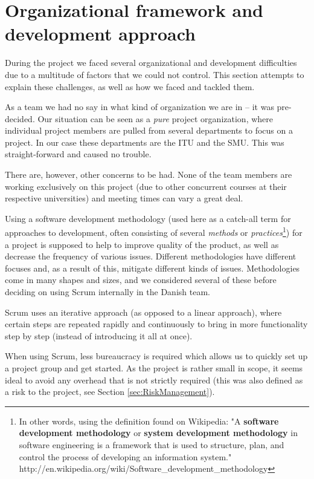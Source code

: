 \section{Organizational framework and development approach}
During the project we faced several organizational and development difficulties due to a multitude of factors that we could not control. This section attempts to explain these challenges, as well as how we faced and tackled them.
\label{sec:EmpiriOrganizational}
\label{sec:organizational}

As a team we had no say in what kind of organization we are in – it was pre-decided. Our
situation can be seen as a \emph{pure} project organization\cite{caye}, where individual project members are
pulled from several departments to focus on a project. In our case these departments are the
ITU and the SMU. This was straight-forward and caused no trouble.

There are, however, other concerns to be had. None of the team members are working exclusively
on this project (due to other concurrent courses at their respective universities) and meeting
times can vary a great deal.


Using a software development methodology (used here as a catch-all term for approaches to
development, often consisting of several \emph{methods} or \emph{practices}\footnote{In other
words, using the definition found on Wikipedia: "A \textbf{software development methodology}
or \textbf{system development methodology} in software engineering is a framework that is used
to structure, plan, and control the process of developing an information system."
http://en.wikipedia.org/wiki/Software_development_methodology}) for a project is supposed to help to
improve quality of the product, as well as decrease the frequency of various issues. Different
methodologies have different focuses and, as a result of this, mitigate different kinds of issues.
Methodologies come in many shapes and sizes, and we considered several of these before deciding
on using Scrum internally in the Danish team.

Scrum uses an iterative approach (as opposed to a linear approach), where certain steps are
repeated rapidly and continuously to bring in more functionality step by step (instead of
introducing it all at once).

When using Scrum, less bureaucracy is required\cite{caye} which allows us to quickly set up a project
group and get started. As the project is rather small in scope, it seems ideal to avoid any overhead
that is not strictly required (this was also defined as a risk to the project, see Section \ref{sec:RiskManagement}).

